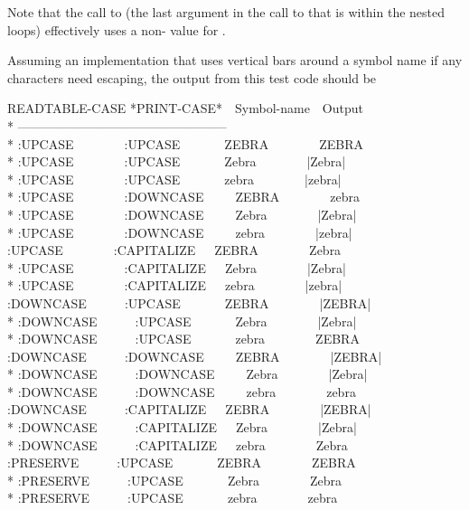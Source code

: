 \begin{defun}[Variable]
\begin{newer}
\noindent
Note that the call to 
(the last argument in the call to  that is within the nested loops)
effectively uses a non-{\false} value for .

Assuming an implementation that uses vertical bars around a symbol name
if any characters need escaping,
the output from this test code should be
\def\foo{-6pt}
\begin{lisp}
READTABLE-CASE *PRINT-CASE*~~Symbol-name~~Output \\*
-------------------------------------------------- \\*
:UPCASE~~~~~~~~:UPCASE~~~~~~~ZEBRA~~~~~~~~ZEBRA \\*
:UPCASE~~~~~~~~:UPCASE~~~~~~~Zebra~~~~~~~~|Zebra| \\*
:UPCASE~~~~~~~~:UPCASE~~~~~~~zebra~~~~~~~~|zebra| \\*
:UPCASE~~~~~~~~:DOWNCASE~~~~~ZEBRA~~~~~~~~zebra \\*
:UPCASE~~~~~~~~:DOWNCASE~~~~~Zebra~~~~~~~~|Zebra| \\*
:UPCASE~~~~~~~~:DOWNCASE~~~~~zebra~~~~~~~~|zebra| \\
:UPCASE~~~~~~~~:CAPITALIZE~~~ZEBRA~~~~~~~~Zebra \\*
:UPCASE~~~~~~~~:CAPITALIZE~~~Zebra~~~~~~~~|Zebra| \\*
:UPCASE~~~~~~~~:CAPITALIZE~~~zebra~~~~~~~~|zebra| \\
:DOWNCASE~~~~~~:UPCASE~~~~~~~ZEBRA~~~~~~~~|ZEBRA| \\*
:DOWNCASE~~~~~~:UPCASE~~~~~~~Zebra~~~~~~~~|Zebra| \\*
:DOWNCASE~~~~~~:UPCASE~~~~~~~zebra~~~~~~~~ZEBRA \\
:DOWNCASE~~~~~~:DOWNCASE~~~~~ZEBRA~~~~~~~~|ZEBRA| \\*
:DOWNCASE~~~~~~:DOWNCASE~~~~~Zebra~~~~~~~~|Zebra| \\*
:DOWNCASE~~~~~~:DOWNCASE~~~~~zebra~~~~~~~~zebra \\
:DOWNCASE~~~~~~:CAPITALIZE~~~ZEBRA~~~~~~~~|ZEBRA| \\*
:DOWNCASE~~~~~~:CAPITALIZE~~~Zebra~~~~~~~~|Zebra| \\*
:DOWNCASE~~~~~~:CAPITALIZE~~~zebra~~~~~~~~Zebra \\
:PRESERVE~~~~~~:UPCASE~~~~~~~ZEBRA~~~~~~~~ZEBRA \\*
:PRESERVE~~~~~~:UPCASE~~~~~~~Zebra~~~~~~~~Zebra \\*
:PRESERVE~~~~~~:UPCASE~~~~~~~zebra~~~~~~~~zebra \\

\end{lisp}
\end{newer}
\end{defun}
